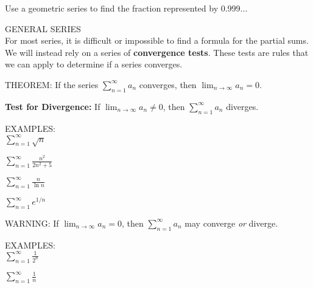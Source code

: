 \documentclass[11pt]{article}
\begin{document}
Use a geometric series to find the fraction represented by 0.999...\\


\pagebreak

GENERAL SERIES\\

For most series, it is difficult or impossible to find a formula for the partial sums.  We will instead
rely on a series of {\bf convergence tests}.  These tests are rules that we can apply to determine if a series converges. \\   

\vspace{.25in}

THEOREM: If the series $\sum_{n=1}^{\infty} a_n $ converges, then $\lim_{n\to\infty}a_n = 0$.\\

\vspace{1in}
 
 {\bf Test for Divergence:}  If $\lim_{n\to\infty}a_n \neq 0$, then $\sum_{n=1}^{\infty} a_n $ diverges.\\
 
 \vspace{1in}
 
 EXAMPLES:\\
 
 $\sum_{n=1}^{\infty} \sqrt{n} $
 
 \vspace{1in}
 
  $\sum_{n=1}^{\infty} \frac{n^2}{2n^2+5} $
 
 \vspace{1in} 
 
 $\sum_{n=1}^{\infty} \frac{n}{\ln{n}} $
 
 \vspace{1in} 
 
 $\sum_{n=1}^{\infty} e^{1/n} $
 
 \vspace{1in}
 
 WARNING:  If $\lim_{n\to\infty}a_n = 0$, then $\sum_{n=1}^{\infty} a_n $ may converge \emph{or} diverge.\\
 
 \vspace{.15in}
 
 EXAMPLES:\\
 
 $\sum_{n=1}^{\infty} \frac{1}{2^n} $
 
  \vspace{1.5in}
 
$\sum_{n=1}^{\infty} \frac{1}{n} $

\vspace{1in}
\end{document}
